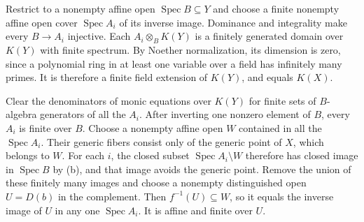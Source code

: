 Restrict to a nonempty affine open $\operatorname{Spec}B\subseteq Y$ and choose a finite nonempty affine open cover $\operatorname{Spec}A_i$ of its inverse image. Dominance and integrality make every $B\to A_i$ injective. Each $A_i\otimes_BK(Y)$ is a finitely generated domain over $K(Y)$ with finite spectrum. By Noether normalization, its dimension is zero, since a polynomial ring in at least one variable over a field has infinitely many primes. It is therefore a finite field extension of $K(Y)$, and equals $K(X)$.

Clear the denominators of monic equations over $K(Y)$ for finite sets of $B$-algebra generators of all the $A_i$. After inverting one nonzero element of $B$, every $A_i$ is finite over $B$. Choose a nonempty affine open $W$ contained in all the $\operatorname{Spec}A_i$. Their generic fibers consist only of the generic point of $X$, which belongs to $W$. For each $i$, the closed subset $\operatorname{Spec}A_i\setminus W$ therefore has closed image in $\operatorname{Spec}B$ by (b), and that image avoids the generic point. Remove the union of these finitely many images and choose a nonempty distinguished open $U=D(b)$ in the complement. Then $f^{-1}(U)\subseteq W$, so it equals the inverse image of $U$ in any one $\operatorname{Spec}A_i$. It is affine and finite over $U$.
